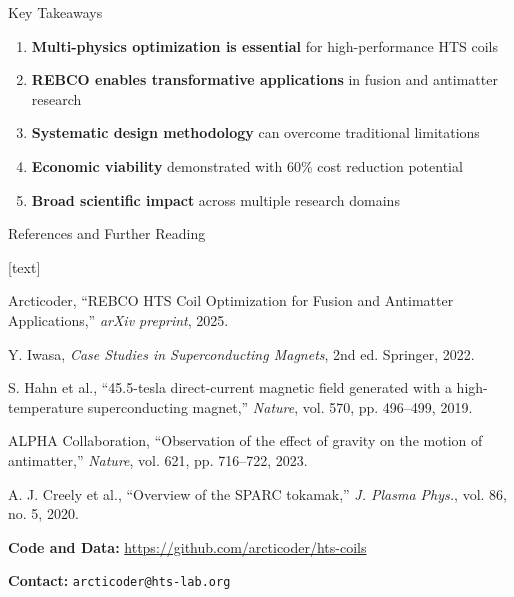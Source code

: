 \begin{frame}{Key Takeaways}
    \begin{enumerate}
        \item \textbf{Multi-physics optimization is essential} for high-performance HTS coils
        \item \textbf{REBCO enables transformative applications} in fusion and antimatter research
        \item \textbf{Systematic design methodology} can overcome traditional limitations
        \item \textbf{Economic viability} demonstrated with 60\% cost reduction potential
        \item \textbf{Broad scientific impact} across multiple research domains
    \end{enumerate}
    
    \vspace{0.5cm}
    \begin{center}
    \end{center}
\end{frame}

\begin{frame}{References and Further Reading}
    \begin{thebibliography}{10}
        [text]
        
         Arcticoder, ``REBCO HTS Coil Optimization for Fusion and Antimatter Applications,'' \textit{arXiv preprint}, 2025.
        
         Y. Iwasa, \textit{Case Studies in Superconducting Magnets}, 2nd ed. Springer, 2022.
        
         S. Hahn et al., ``45.5-tesla direct-current magnetic field generated with a high-temperature superconducting magnet,'' \textit{Nature}, vol. 570, pp. 496--499, 2019.
        
         ALPHA Collaboration, ``Observation of the effect of gravity on the motion of antimatter,'' \textit{Nature}, vol. 621, pp. 716--722, 2023.
        
         A. J. Creely et al., ``Overview of the SPARC tokamak,'' \textit{J. Plasma Phys.}, vol. 86, no. 5, 2020.
        
    \end{thebibliography}
    
    \vspace{0.5cm}
    \textbf{Code and Data:} \url{https://github.com/arcticoder/hts-coils}
    
    \textbf{Contact:} \texttt{arcticoder@hts-lab.org}
\end{frame}

